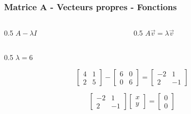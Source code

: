 \begin{frame}
    \frametitle{Matrice A - Vecteurs propres - Fonctions}
    \begin{columns}
		\begin{column}{0.5\textwidth}
			\centering
			$A-\lambda I$
		\end{column}
		\begin{column}{0.5\textwidth}
			\centering
			$A \vec v=\lambda\vec v$
		\end{column}
	\end{columns}

    \vspace{0.5cm}

    \begin{columns}
		\begin{column}{0.5\textwidth}
			\centering
			$\lambda=6$

            \begin{equation}
                \begin{bmatrix}
                    4&1\\
                    2&5
                \end{bmatrix}
                -
                \begin{bmatrix}
                    6&0\\
                    0&6
                \end{bmatrix}
                =
                \begin{bmatrix}
                    -2&1\\
                    2&-1
                \end{bmatrix}
            \end{equation}

            \begin{equation}
                \begin{bmatrix}
                    -2&1\\
                    2&-1
                \end{bmatrix}
                \begin{bmatrix}
                    x\\y
                \end{bmatrix}
                =
                \begin{bmatrix}
                    0\\0
                \end{bmatrix}
            \end{equation}


\end{column}
\end{columns}
\end{frame}
